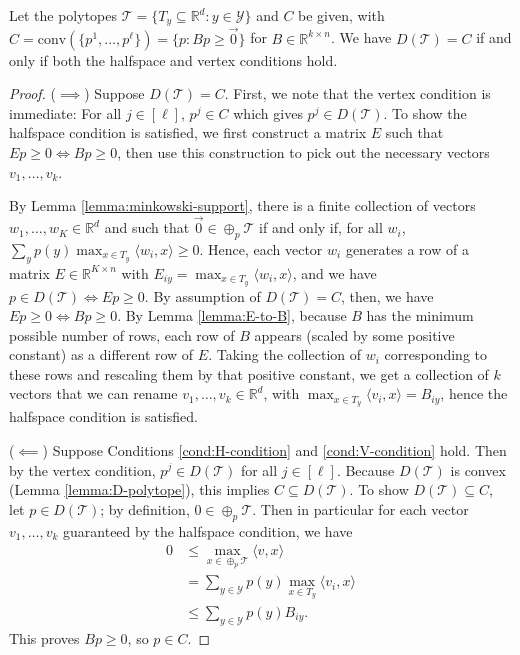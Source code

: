 \documentclass[anon]{colt2020} %
\newcommand{\reals}{\mathbb{R}}
\newcommand{\T}{\mathcal{T}}
\newcommand{\Y}{\mathcal{Y}}
\newcommand{\inprod}[2]{\langle #1, #2 \rangle}%
\newcommand{\conv}{\mathrm{conv}}
\begin{document}
\begin{theorem} \label{thm:vertex-halfspace-opt}
  Let the polytopes $\T = \{T_y \subseteq \reals^d : y \in \Y\}$ and $C$ be given, with $C = \conv(\{p^1,\ldots,p^{\ell}\}) = \{p: Bp \geq \vec 0\}$ for $B \in \reals^{k \times n}$.
  We have $D(\T) = C$ if and only if both the halfspace and vertex conditions hold.
\end{theorem}
\begin{proof}
  ($\implies$)
  Suppose $D(\T) = C$.
  First, we note that the vertex condition is immediate: For all $j \in [\ell]$, $p^j \in C$ which gives $p^j \in D(\T)$.
  To show the halfspace condition is satisfied, we first construct a matrix $E$ such that $Ep \geq 0 \iff Bp \geq 0$, then use this construction to pick out the necessary vectors $v_1,\dots,v_k$.

  By Lemma \ref{lemma:minkowski-support}, there is a finite collection of vectors $w_1,\dots,w_{K} \in \reals^d$ and such that $\vec 0 \in \oplus_p \T$ if and only if, for all $w_i$, $\sum_y p(y) \max_{x \in T_y} \inprod{w_i}{x} \geq 0$.
  Hence, each vector $w_i$ generates a row of a matrix $E \in \reals^{K \times n}$ with $E_{iy} = \max_{x \in T_y} \inprod{w_i}{x}$, and we have $p \in D(\T) \iff Ep \geq 0$.
  By assumption of $D(\T) = C$, then, we have $Ep \geq 0 \iff Bp \geq 0$.
  By Lemma \ref{lemma:E-to-B}, because $B$ has the minimum possible number of rows, each row of $B$ appears (scaled by some positive constant) as a different row of $E$. Taking the collection of $w_i$ corresponding to these rows and rescaling them by that positive constant, we get a collection of $k$ vectors that we can rename $v_1,\ldots,v_k \in \reals^d$, with $\max_{x \in T_y} \inprod{v_i}{x} = B_{iy}$, hence the halfspace condition is satisfied.

  ($\impliedby$)
  Suppose Conditions \ref{cond:H-condition} and \ref{cond:V-condition} hold.
  Then by the vertex condition, $p^j \in D(\T)$ for all $j \in [\ell]$.
  Because $D(\T)$ is convex (Lemma \ref{lemma:D-polytope}), this implies $C \subseteq D(\T)$.
  To show $D(\T) \subseteq C$, let $p \in D(\T)$; by definition, $0 \in \oplus_p \T$.
  Then in particular for each vector $v_1,\ldots,v_k$ guaranteed by the halfspace condition, we have
  \begin{align*}
    0 &\leq \max_{x \in \oplus_p \T} \inprod{v}{x}  \\
      &=    \sum_{y \in \Y} p(y) \max_{x \in T_y} \inprod{v_i}{x}  \\
      &\leq \sum_{y \in \Y} p(y) B_{iy} .
  \end{align*}
  This proves $Bp \geq 0$, so $p \in C$.
\end{proof}
\end{document}
